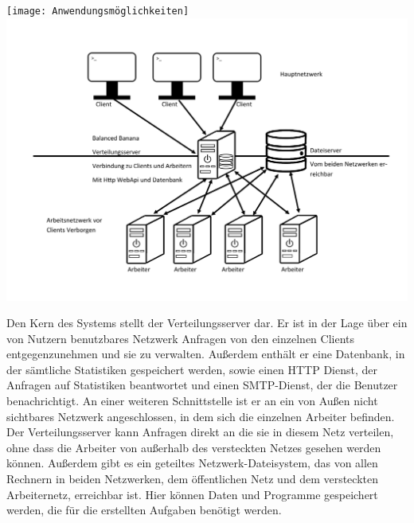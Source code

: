 \documentclass[a4paper,12pt]{article}
\begin{document}
\texttt{[image: Anwendungsmöglichkeiten]}
\includegraphics[width=\textwidth]{Systemmodelle/Systemaufbau}

Den Kern des Systems stellt der Verteilungsserver dar. Er ist in der Lage über ein von Nutzern benutzbares Netzwerk Anfragen von den einzelnen Clients entgegenzunehmen und sie zu verwalten.
Außerdem enthält er eine Datenbank, in der sämtliche Statistiken gespeichert werden, sowie einen HTTP Dienst, der Anfragen auf Statistiken beantwortet und einen SMTP-Dienst, der die Benutzer benachrichtigt. An einer weiteren Schnittstelle ist er an ein von Außen nicht sichtbares Netzwerk angeschlossen, in dem sich die einzelnen Arbeiter befinden. Der Verteilungsserver kann Anfragen direkt an die sie in diesem Netz verteilen, ohne dass die Arbeiter von außerhalb des versteckten Netzes gesehen werden können. Außerdem gibt es ein geteiltes Netzwerk-Dateisystem, das von allen Rechnern in beiden Netzwerken, dem öffentlichen Netz und dem versteckten Arbeiternetz, erreichbar ist. Hier können Daten und Programme gespeichert werden, die für die erstellten Aufgaben benötigt werden.


\clearpage
\end{document}
